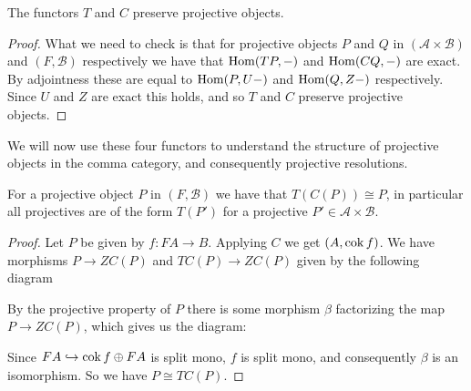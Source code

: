 \begin{cor}
	The functors $T$ and $C$ preserve projective objects.
	\begin{proof}
		What we need to check is that for projective objects $P$ and $Q$ in $(\mathcal A \times \mathcal B)$ and $(F, \mathcal B)$ respectively we have that $\operatorname{Hom}(TP, -)$ and $\operatorname{Hom}(CQ, -)$ are exact. By adjointness these are equal to $\operatorname{Hom}(P, U-)$ and $\operatorname{Hom}(Q, Z-)$ respectively. Since $U$ and $Z$ are exact this holds, and so $T$ and $C$ preserve projective objects.
	\end{proof}
\end{cor}

We will now use these four functors to understand the structure of projective objects in the comma category, and consequently projective resolutions.

\begin{prop}\cite[Corollary~1.6c]{FGR75}
	For a projective object $P$ in $(F, \mathcal B)$ we have that $T(C(P)) \cong P$, in particular all projectives are of the form $T(P')$ for a projective $P' \in \mathcal A \times \mathcal B$.
	\begin{proof}
		Let $P$ be given by $f\colon FA \to B$. Applying $C$ we get $(A, \operatorname{cok} f)$. We have morphisms $P \to ZC(P)$ and $TC(P) \to ZC(P)$ given by the following diagram
		\begin{center}
		\end{center}
		By the projective property of $P$ there is some morphism $\beta$ factorizing the map $P \to ZC(P)$, which gives us the diagram:
		\begin{center}
		\end{center}
		Since $FA \hookrightarrow \operatorname{cok} f \oplus FA$ is split mono, $f$ is split mono, and consequently $\beta$ is an isomorphism. So we have $P \cong TC(P)$.
	\end{proof}
\end{prop}

